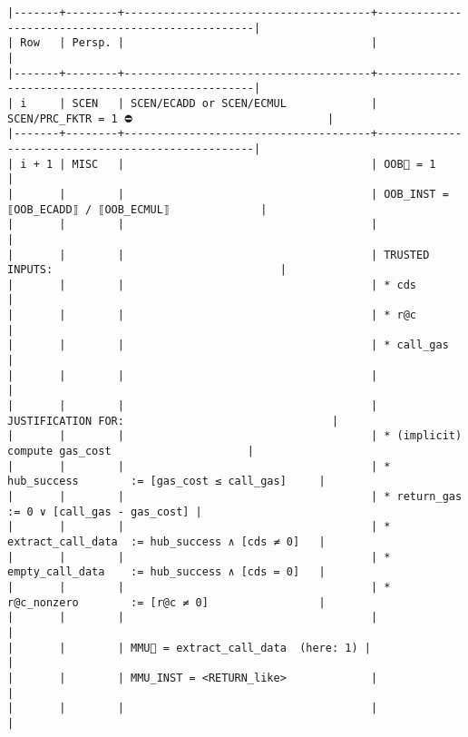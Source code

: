 \documentclass[varwidth=\maxdimen,margin=0.5cm,multi={verbatim}]{standalone}
\begin{document}
\begin{verbatim}
|-------+--------+--------------------------------------+---------------------------------------------------|
| Row   | Persp. |                                      |                                                   |
|-------+--------+--------------------------------------+---------------------------------------------------|
| i     | SCEN   | SCEN/ECADD or SCEN/ECMUL             | SCEN/PRC_FKTR = 1 ⛔                              |
|-------+--------+--------------------------------------+---------------------------------------------------|
| i + 1 | MISC   |                                      | OOB🚩 = 1                                         |
|       |        |                                      | OOB_INST = ⟦OOB_ECADD⟧ / ⟦OOB_ECMUL⟧              |
|       |        |                                      |                                                   |
|       |        |                                      | TRUSTED INPUTS:                                   |
|       |        |                                      | * cds                                             |
|       |        |                                      | * r@c                                             |
|       |        |                                      | * call_gas                                        |
|       |        |                                      |                                                   |
|       |        |                                      | JUSTIFICATION FOR:                                |
|       |        |                                      | * (implicit) compute gas_cost                     |
|       |        |                                      | * hub_success        := [gas_cost ≤ call_gas]     |
|       |        |                                      | * return_gas         := 0 ∨ [call_gas - gas_cost] |
|       |        |                                      | * extract_call_data  := hub_success ∧ [cds ≠ 0]   |
|       |        |                                      | * empty_call_data    := hub_success ∧ [cds = 0]   |
|       |        |                                      | * r@c_nonzero        := [r@c ≠ 0]                 |
|       |        |                                      |                                                   |
|       |        | MMU🚩 = extract_call_data  (here: 1) |                                                   |
|       |        | MMU_INST = <RETURN_like>             |                                                   |
|       |        |                                      |                                                   |

\end{verbatim}
\end{document}
